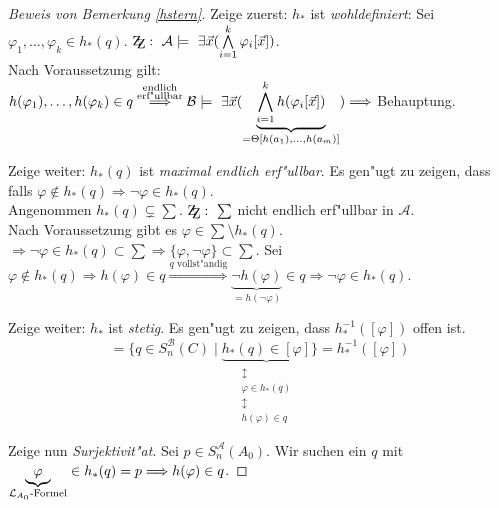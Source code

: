 \documentclass[a4paper,12pt,numbers=noenddot,parskip=full]{scrartcl}
\newcommand{\Exists}{~\exists}
\newcommand{\scrL}{\mathcal{L}}
\newcommand{\scrA}{\mathcal{A}}
\newcommand{\scrB}{\mathcal{B}}
\newcommand{\zz}{\mathrm{Z\kern-.3em\raise-0.5ex\hbox{Z}}:~}
\theoremstyle{dotless}
\begin{document}
\begin{proof}[Beweis von Bemerkung \ref{hstern}]
	Zeige zuerst: $h_*$ ist \emph{wohldefiniert}: Sei $\varphi_1, \dots, \varphi_k \in h_*(q)$. $\zz \scrA \models \Exists \vec{x}(\bigwedge\limits_{i=1}^k \varphi_i [\vec{x}])$.\\
	Nach Voraussetzung gilt: $h(\varphi_1), \dots, h(\varphi_k) \in q \overset{\substack{\text{endlich}\\\text{erf"ullbar}}}{\Longrightarrow} \scrB \models \Exists \vec{x} (\underbrace{\bigwedge\limits_{i=1}^k h(\varphi_i[\vec{x}])}_{= \Theta[h(a_1), \dots, h(a_m)]}) \\\Longrightarrow$ Behauptung.
	
	Zeige weiter: $h_*(q)$ ist \emph{maximal endlich erf"ullbar}. Es gen"ugt zu zeigen, dass falls $\varphi \notin h_*(q) \Longrightarrow \lnot \varphi \in h_*(q)$.\\
	Angenommen $h_*(q) \subsetneq \sum$. $\zz \sum$ nicht endlich erf"ullbar in $\scrA$.\\
	Nach Voraussetzung gibt es $\varphi \in \sum \setminus h_*(q)$. $\Longrightarrow \lnot \varphi \in h_*(q) \subset \sum \Longrightarrow \{\varphi, \lnot \varphi \} \subset \sum$. Sei $\varphi \notin h_*(q) \Longrightarrow h(\varphi) \in q \overset{q \text{ vollst"andig}}{\Longrightarrow} \underbrace{\lnot h(\varphi)}_{=h(\lnot \varphi)} \in q \Longrightarrow \lnot \varphi \in h_*(q)$.
	
	Zeige weiter: $h_*$ ist \emph{stetig}. Es gen"ugt zu zeigen, dass $h_*^{-1}([\varphi])$ offen ist.
	\begin{equation*}
		[h(\overbrace{\varphi}^{\scrL_{B_0} \text{-Formel}})] = \{q \in S_n^\scrB (C) \mid \underbrace{h_*(q) \in [\varphi]}_{\substack{\updownarrow\\\varphi \in h_*(q)\\\updownarrow\\h(\varphi) \in q}} \} = h_*^{-1}([\varphi])
	\end{equation*}
	
	Zeige nun \emph{Surjektivit"at}. Sei $p \in S_n^\scrA (A_0)$. Wir suchen ein $q$ mit $\underbrace{\varphi}_{\scrL_{A_0}\text{-Formel}} \in h_*(q) = p \\\Longrightarrow h(\varphi) \in q$.
	

\end{proof}
\end{document}
